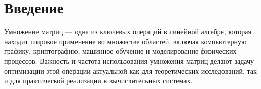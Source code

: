 \chapter*{Введение}

Умножение матриц — одна из ключевых операций в линейной алгебре,
которая находит широкое применение во множестве областей,
включая компьютерную графику, криптографию,
машинное обучение и моделирование физических процессов.
Важность и частота использования умножения матриц делают задачу
оптимизации этой операции актуальной как для теоретических исследований,
так и для практической реализации в вычислительных системах.

